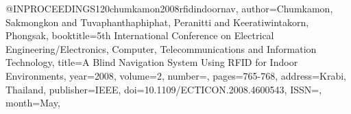 @INPROCEEDINGS{120chumkamon2008rfidindoornav, 
author={Chumkamon, Sakmongkon and Tuvaphanthaphiphat, Peranitti and Keeratiwintakorn, Phongsak},
booktitle={5th International Conference on Electrical Engineering/Electronics, Computer, Telecommunications and Information Technology}, 
title={A Blind Navigation System Using RFID for Indoor Environments}, 
year={2008},
volume={2},
number={},
pages={765-768},
address={Krabi, Thailand},
publisher={IEEE},
doi={10.1109/ECTICON.2008.4600543},
ISSN={},
month={May},}